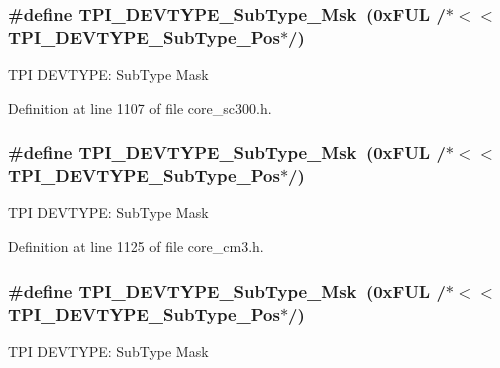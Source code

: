 \subsubsection[{\texorpdfstring{T\+P\+I\+\_\+\+D\+E\+V\+T\+Y\+P\+E\+\_\+\+Sub\+Type\+\_\+\+Msk}{TPI_DEVTYPE_SubType_Msk}}]{\setlength{\rightskip}{0pt plus 5cm}\#define T\+P\+I\+\_\+\+D\+E\+V\+T\+Y\+P\+E\+\_\+\+Sub\+Type\+\_\+\+Msk~(0x\+F\+U\+L /$\ast$$<$$<$ T\+P\+I\+\_\+\+D\+E\+V\+T\+Y\+P\+E\+\_\+\+Sub\+Type\+\_\+\+Pos$\ast$/)}\hypertarget{group___c_m_s_i_s___t_p_i_ga5b2fd7dddaf5f64855d9c0696acd65c1}{}\label{group___c_m_s_i_s___t_p_i_ga5b2fd7dddaf5f64855d9c0696acd65c1}
T\+PI D\+E\+V\+T\+Y\+PE\+: Sub\+Type Mask 

Definition at line 1107 of file core\+\_\+sc300.\+h.

\subsubsection[{\texorpdfstring{T\+P\+I\+\_\+\+D\+E\+V\+T\+Y\+P\+E\+\_\+\+Sub\+Type\+\_\+\+Msk}{TPI_DEVTYPE_SubType_Msk}}]{\setlength{\rightskip}{0pt plus 5cm}\#define T\+P\+I\+\_\+\+D\+E\+V\+T\+Y\+P\+E\+\_\+\+Sub\+Type\+\_\+\+Msk~(0x\+F\+U\+L /$\ast$$<$$<$ T\+P\+I\+\_\+\+D\+E\+V\+T\+Y\+P\+E\+\_\+\+Sub\+Type\+\_\+\+Pos$\ast$/)}\hypertarget{group___c_m_s_i_s___t_p_i_ga5b2fd7dddaf5f64855d9c0696acd65c1}{}\label{group___c_m_s_i_s___t_p_i_ga5b2fd7dddaf5f64855d9c0696acd65c1}
T\+PI D\+E\+V\+T\+Y\+PE\+: Sub\+Type Mask 

Definition at line 1125 of file core\+\_\+cm3.\+h.

\subsubsection[{\texorpdfstring{T\+P\+I\+\_\+\+D\+E\+V\+T\+Y\+P\+E\+\_\+\+Sub\+Type\+\_\+\+Msk}{TPI_DEVTYPE_SubType_Msk}}]{\setlength{\rightskip}{0pt plus 5cm}\#define T\+P\+I\+\_\+\+D\+E\+V\+T\+Y\+P\+E\+\_\+\+Sub\+Type\+\_\+\+Msk~(0x\+F\+U\+L /$\ast$$<$$<$ T\+P\+I\+\_\+\+D\+E\+V\+T\+Y\+P\+E\+\_\+\+Sub\+Type\+\_\+\+Pos$\ast$/)}\hypertarget{group___c_m_s_i_s___t_p_i_ga5b2fd7dddaf5f64855d9c0696acd65c1}{}\label{group___c_m_s_i_s___t_p_i_ga5b2fd7dddaf5f64855d9c0696acd65c1}
T\+PI D\+E\+V\+T\+Y\+PE\+: Sub\+Type Mask 

